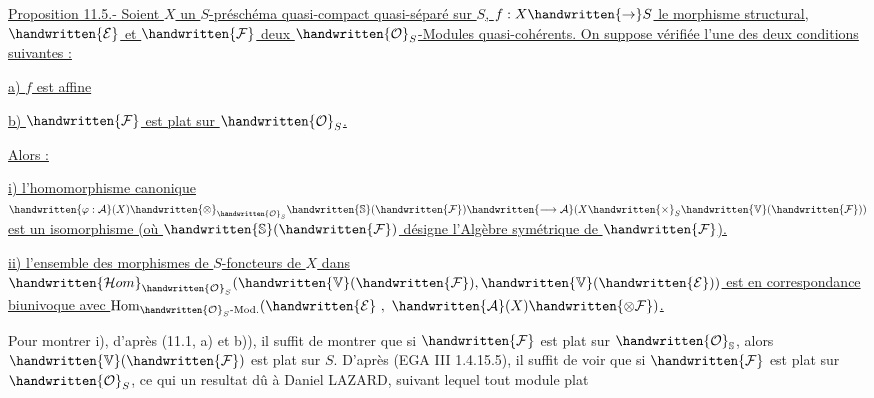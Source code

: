 \uline{Proposition 11.5.- Soient $X$ un $S$-préschéma quasi-compact quasi-séparé sur $S$, $f:X\handwritten{\to}S$ le morphisme structural, $\handwritten{\mathcal{E}}$ et $\handwritten{\mathcal{F}}$ deux $\handwritten{\mathcal{O}}_S$-Modules quasi-cohérents. On suppose vérifiée l'une des deux conditions suivantes :}

\uline{a) $f$ est affine}

\uline{b) $\handwritten{\mathcal{F}}$ est plat sur $\handwritten{\mathcal{O}}_S$.}

\uline{Alors :}

\uline{i) l'homomorphisme canonique $\handwritten{\varphi:\mathcal{A}}(X)\handwritten{\otimes}_{\handwritten{\mathcal{O}}_S}\handwritten{\mathbb{S}}(\handwritten{\mathcal{F}})\handwritten{\longrightarrow\mathcal{A}}(X\handwritten{\times}_S\handwritten{\mathbb{V}}(\handwritten{\mathcal{F}}))$ est un isomorphisme (où $\handwritten{\mathbb{S}}(\handwritten{\mathcal{F}})$ désigne l'Algèbre symétrique de $\handwritten{\mathcal{F}}$).}

\uline{ii) l'ensemble des morphismes de $S$-foncteurs de $X$ dans $\handwritten{\mathcal{H}om}_{\handwritten{\mathcal{O}}_S}(\handwritten{\mathbb{V}}(\handwritten{\mathcal{F}}),\handwritten{\mathbb{V}}(\handwritten{\mathcal{E}}))$ est en correspondance biunivoque avec $\operatorname{Hom}_{\handwritten{\mathcal{O}}_S\text{-}\mathrm{Mod.}}(\handwritten{\mathcal{E}}\ ,\ \handwritten{\mathcal{A}}(X)\handwritten{\otimes\mathcal{F}})$.}

Pour montrer i), d'après (11.1, a) et b)), il suffit de montrer que si $\handwritten{\mathcal{F}}$ est plat sur $\handwritten{\mathcal{O}}_{\mathbb{S}}$,  alors $\handwritten{\mathbb{V}}(\handwritten{\mathcal{F}})$ est plat sur $S$. D'après (EGA III 1.4.15.5),
il suffit de voir que si $\handwritten{\mathcal{F}}$ est plat sur $\handwritten{\mathcal{O}}_S$,  ce qui un resultat dû à Daniel LAZARD, suivant lequel tout module plat 

